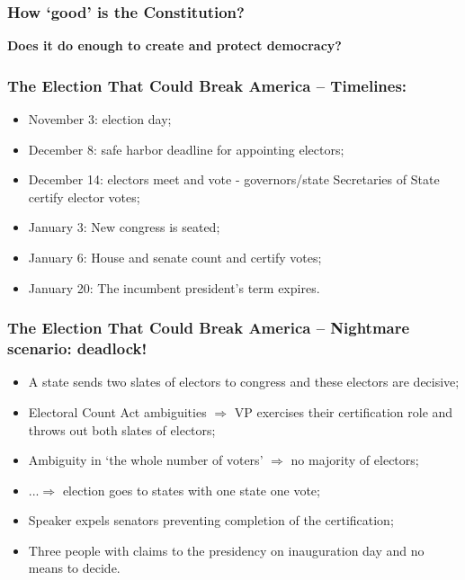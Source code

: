 \documentclass[aspectratio=169]{beamer}
\theoremstyle{principle}
\begin{document}
\begin{frame}
\frametitle{How `good' is the Constitution?}

\begin{center}
\Huge\textbf{Does it do enough to create and protect democracy?}
\end{center}

\end{frame}

\begin{frame}
\frametitle{The Election That Could Break America -- Timelines:}

\begin{itemize}
\item<1-> November 3: election day;
\bigskip
\item<2-> December 8: safe harbor deadline for appointing electors;
\bigskip
\item<3-> December 14: electors meet and vote - governors/state Secretaries of State certify elector votes;
\bigskip
\item<4-> January 3: New congress is seated;
\bigskip
\item<5-> January 6: House and senate count and certify votes;
\bigskip
\item<6-> January 20: The incumbent president’s term expires.
\end{itemize}

\end{frame}

\begin{frame}
\frametitle{The Election That Could Break America -- Nightmare scenario: deadlock!}

\begin{itemize}
\item<1-> A state sends two slates of electors to congress and these electors are decisive;
\bigskip
\item<2-> Electoral Count Act ambiguities $\Rightarrow$ VP exercises their certification role and throws out both slates of electors;
\bigskip
\item<3-> Ambiguity in ‘the whole number of voters’ $\Rightarrow$ no majority of electors;
\bigskip
\item<4-> ...$\Rightarrow$ election goes to states with one state one vote;
\bigskip
\item<5-> Speaker expels senators preventing completion of the certification;
\bigskip
\item<6-> Three people with claims to the presidency on inauguration day and no means to decide.
\end{itemize}

\end{frame}
\end{document}
